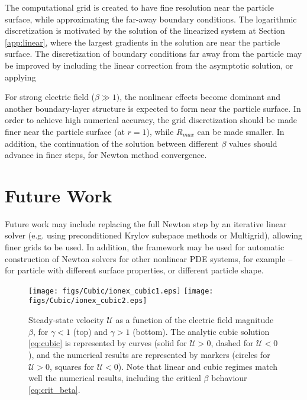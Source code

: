 \documentclass[MSc,beforeExam]{iitcsthesis}
\newcommand\cU{\mathscr{U}}
\begin{document}
The computational grid is created to have fine resolution near the particle surface, while
approximating the far-away boundary conditions. The logarithmic discretization is motivated
by the solution of the linearized system at Section \ref{app:linear}, 
where the largest gradients in the solution are near the particle surface.
The discretization of boundary conditions far away from the particle may be improved
by including the linear correction from the asymptotic solution, or applying 


For strong electric field ($\beta \gg 1)$, the nonlinear effects become dominant and
another boundary-layer structure is expected to form near the particle surface. 
In order to achieve high numerical accuracy, the grid discretization should be made finer
near the particle surface (at $r = 1$), while $R_{max}$ can be made smaller.
In addition, the continuation of the solution between different $\beta$ values
should advance in finer steps, for Newton method convergence.

\section{Future Work}
Future work may include replacing the full Newton step by an iterative linear solver
(e.g. using preconditioned Krylov subspace methods \cite{saad2003book} or
Multigrid), allowing finer grids to be used.
In addition, the framework may be used for automatic construction of Newton solvers 
for other nonlinear PDE systems, for example -- for particle with different surface 
properties, or different particle shape.

\begin{figure}
    \begin{center}
    \texttt{[image: figs/Cubic/ionex\_cubic1.eps]}
    \texttt{[image: figs/Cubic/ionex\_cubic2.eps]}
        \caption[Ion exchanger steady-state velocity]{
        Steady-state velocity $\cU$ as a function of the 
        electric field magnitude $\beta$, for $\gamma < 1$ (top) and $\gamma > 1$ (bottom). 
        The analytic cubic solution \eqref{eq:cubic} is represented by curves
        (solid for $\cU > 0$, dashed for $\cU < 0$), 
        and the numerical results are represented by markers 
        (circles for $\cU > 0$, squares for $\cU < 0$). Note that linear and
        cubic regimes match well the numerical results, including the critical $\beta$ 
        behaviour \eqref{eq:crit_beta}. 
        }
	    \label{fig:IonExCubic}
    \end{center}
\end{figure}
\end{document}
